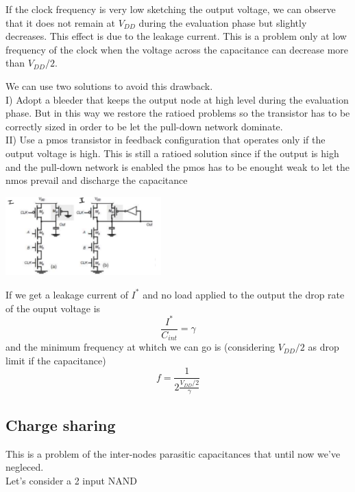 If the clock frequency is very low sketching the output voltage, we can observe that it does not remain at $V_{DD}$ during the evaluation phase but slightly decreases. This effect is due to the leakage current.
This is a problem only at low frequency of the clock when the voltage across the capacitance can decrease more than $V_{DD}/2$.\\
\vspace{5mm}

We can use two solutions to avoid this drawback.\\
\tab I) Adopt a bleeder that keeps the output node at high level during the evaluation phase. But in this way we restore the ratioed problems so the transistor has to be correctly sized in order to be let the pull-down network dominate.\\
\tab II) Use a pmos transistor in feedback configuration that operates only if the output voltage is high. This is still a ratioed solution since if the output is high and the pull-down network is enabled the pmos has to be enought weak to let the nmos prevail and discharge the capacitance

\centering
\includegraphics[width=0.45\textwidth]{C9_3.png}\\
\raggedright

\vspace{5mm}

If we get a leakage current of ${I^*}$ and no load applied to the output the drop rate of the ouput voltage is
\begin{equation}
\frac{I^*}{C_{int}}=\gamma
\end{equation}
and the minimum frequency at whitch we can go is (considering $V_{DD}/2$ as drop limit if the capacitance)
\begin{equation}
f=\frac{1}{2 \frac{V_{DD}/2}{\gamma}}
\end{equation}

\subsection{Charge sharing}
This is a problem of the inter-nodes parasitic capacitances that until now we've negleced.\\
Let's consider a 2 input NAND

